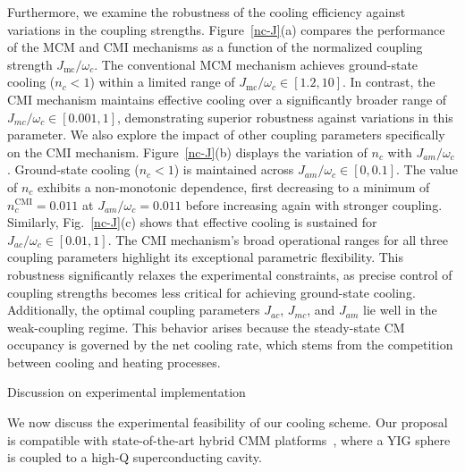 \documentclass[aps, prresearch, reprint, nofootinbib, longbibliography]{revtex4-2}
\makeatletter
\renewcommand{\thesection}{\Alph{section}}%
\renewcommand{\section}{%
		\secdef{\@Appendix}{\@sAppendix}%
	}%
\newcommand{\@Appendix}[2][?]{%
		\refstepcounter{section}%
		\vspace{0.5em}
		{\centering\large\bfseries Appendix \thesection: #2\par}%
		\addcontentsline{toc}{section}{Appendix \thesection}%
		\markright{Appendix \thesection}%
	}%
\makeatother
\begin{document}
Furthermore, we examine the robustness of the cooling efficiency against variations in the coupling strengths. Figure~\ref{nc-J}(a) compares the performance of the MCM and CMI mechanisms as a function of the normalized coupling strength
$J_{\text{mc}}/\omega_c$. The conventional MCM mechanism achieves ground-state cooling ($n_c < 1$) within a limited range of $J_{\text{mc}}/\omega_c \in [1.2, 10]$.  In contrast, the CMI mechanism maintains effective cooling over a significantly broader range of $J_{mc}/\omega_c \in [0.001, 1]$, demonstrating superior robustness against variations in this parameter.
We also explore the impact of other coupling parameters specifically on the CMI mechanism. Figure~\ref{nc-J}(b) displays the variation of $n_c$ with $J_{am}/\omega_c$. Ground-state cooling ($n_c < 1$) is maintained across $J_{am}/\omega_c \in [0, 0.1]$. The value of $n_c$ exhibits a non-monotonic dependence, first decreasing to a minimum of $n_c^{\mathrm{CMI}} = 0.011$ at $J_{am}/\omega_c = 0.011$ before increasing again with stronger coupling.  Similarly, Fig.~\ref{nc-J}(c) shows that effective cooling is sustained for $J_{ac}/\omega_c \in [0.01, 1]$. The CMI mechanism's broad operational ranges for all three coupling parameters highlight its exceptional parametric flexibility. This robustness significantly relaxes the experimental constraints, as precise control of coupling strengths becomes less critical for achieving ground-state cooling. 
Additionally, the optimal coupling parameters $J_{ac}$, $J_{mc}$, and $J_{am}$ lie well in the weak-coupling regime. This behavior arises because the steady-state CM occupancy is governed by the net cooling rate, which stems from the competition between cooling and heating processes. 



\section{Discussion on experimental implementation}\label{VII}



We now discuss the experimental feasibility of our cooling scheme. %
Our proposal is compatible with state-of-the-art hybrid CMM platforms~\cite{PhysRevLett.113.156401}, where a YIG sphere is coupled to a high-Q superconducting cavity.
\end{document}

